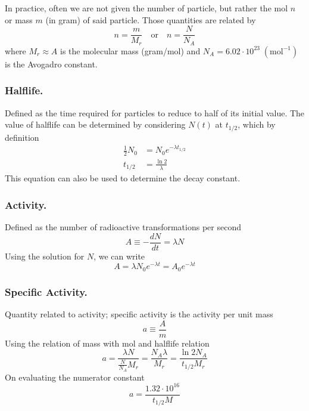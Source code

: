 \documentclass[../../../main.tex]{subfiles}
\begin{document}
In practice, often we are not given the number of particle, but rather the mol $n$ or mass $m$ (in gram) of said particle. Those quantities are related by 
\begin{equation*}
    n=\frac{m}{M_r}\quad \text{or}\quad n=\frac{N}{N_A}
\end{equation*}
where $M_r\approx A$ is the molecular mass (gram/mol) and $N_A=6.02\cdot 10^{23}\;(\text{mol}^{-1})$ is the Avogadro constant.

\subsubsection*{Halflife.} Defined as the time required for particles to reduce to half of its initial value. The value of halflife can be determined by considering $N(t)$ at $t_{1/2}$, which by definition
\begin{align*}
    \frac{1}{2}N_0&=N_0e^{-\lambda t_{1/2}}\\
    t_{1/2}&=\frac{\ln 2}{\lambda}
\end{align*}
This equation can also be used to determine the decay constant.

\subsubsection*{Activity.} Defined as the number of radioactive transformations per second
\begin{equation*}
    A\equiv-\frac{dN}{dt}=\lambda N
\end{equation*}
Using the solution for $N$, we can write
\begin{equation*}
    A=\lambda N_0 e^{-\lambda t}=A_0e^{-\lambda t}
\end{equation*}

\subsubsection*{Specific Activity.} Quantity related to activity; specific activity is the activity per unit mass
\begin{equation*}
    a\equiv\frac{A}{m}
\end{equation*}
Using the relation of mass with mol and halflife relation
\begin{equation*}
    a=\frac{\lambda N}{\frac{N}{N_A}M_r}=\frac{N_A \lambda }{M_r}=\frac{\ln 2 N_A}{t_{1/2}M_r}
\end{equation*}
On evaluating the numerator constant
\begin{equation*}
    a=\frac{1.32\cdot 10^{16}}{t_{1/2}M}
\end{equation*}
\end{document}
